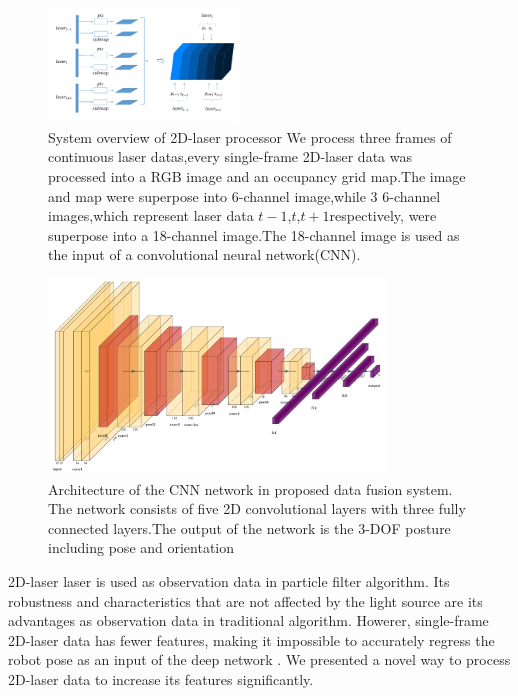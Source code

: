 \documentclass[journal]{IEEEtran}
\begin{document}
\begin{figure}
	\centering
	\includegraphics[width=0.45\textwidth]{figure3.pdf}
	\caption{ System overview of 2D-laser processor We process three frames of continuous laser datas,every single-frame 2D-laser data  was processed into a RGB image and an occupancy grid map.The image and map  were superpose into 6-channel image,while 3 6-channel images,which represent laser data $t-1$,$t$,$t+1$respectively, were superpose into a 18-channel image.The 18-channel image is used as the input of a  convolutional neural network(CNN).}
\end{figure}


\begin{figure}[htb]
	\centering
	\includegraphics[width=0.8\textwidth]{cnn_bn.pdf}
	\caption{ Architecture of the CNN network in proposed data fusion system. The network consists of five 2D convolutional layers  with three fully connected layers.The output of the network is the 3-DOF  posture including pose and orientation } 
	 \label{fig:curl1}
\end{figure}


2D-laser laser is used as observation data in particle filter algorithm. Its robustness and characteristics that are not affected by the light source are its advantages as observation data in traditional algorithm. Howerer, single-frame 2D-laser data has fewer features, making it impossible to accurately regress the robot pose as an input of the deep network \cite{li2017deep}. We presented a novel way to process 2D-laser data to  increase its features significantly.
\end{document}
